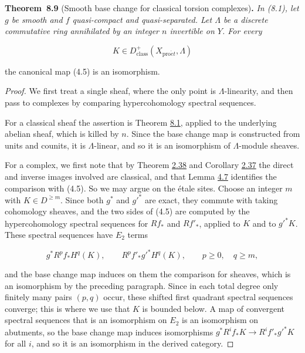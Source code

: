 \documentclass[11pt]{article}
\newenvironment{bpstatement}[2]{\par\addvspace{0.6\baselineskip}\noindent\textbf{#1}#2\textbf{.}\enspace\ignorespaces}
  {\par\addvspace{0.4\baselineskip}}
\newenvironment{bpstatementit}[2]{\begin{bpstatement}{#1}{#2}\itshape\ignorespaces}{\end{bpstatement}}
\begin{document}
\label{bp674}%
\begin{bpstatementit}{Theorem~8.9}{ (Smooth base change for classical torsion complexes)}
In (8.1), let \(g\) be smooth and \(f\) quasi-compact and quasi-separated. Let \(\Lambda\) be a discrete commutative ring annihilated by an integer \(n\) invertible on \(Y\). For every

\[
K\in D^+_{\mathrm{class}}(X_{\mathrm{pro}\acute{e}t},\Lambda)
\]

the canonical map (4.5) is an isomorphism.
\end{bpstatementit}

\begin{proof}[{Proof}]\label{bp675}%
We first treat a single sheaf, where the only point is \(\Lambda\)-linearity, and then pass to complexes by comparing hypercohomology spectral sequences.

For a classical sheaf the assertion is Theorem \hyperref[bp643]{8.1}, applied to the underlying abelian sheaf, which is killed by \(n\). Since the base change map is constructed from units and counits, it is \(\Lambda\)-linear, and so it is an isomorphism of \(\Lambda\)-module sheaves.

For a complex, we first note that by Theorem \hyperref[bp113]{2.38} and Corollary \hyperref[bp109]{2.37} the direct and inverse images involved are classical, and that Lemma \hyperref[bp304]{4.7} identifies the comparison with (4.5). So we may argue on the étale sites. Choose an integer \(m\) with \(K\in D^{\geq m}\). Since both \(g^*\) and \(g'^*\) are exact, they commute with taking cohomology sheaves, and the two sides of (4.5) are computed by the hypercohomology spectral sequences for \(Rf_*\) and \(Rf'_*\), applied to \(K\) and to \(g'^*K\). These spectral sequences have \(E_2\) terms

\[
g^*R^pf_*H^q(K),\qquad R^pf'_*g'^*H^q(K),
\qquad p\geq0,\quad q\geq m,
\]

and the base change map induces on them the comparison for sheaves, which is an isomorphism by the preceding paragraph. Since in each total degree only finitely many pairs \((p,q)\) occur, these shifted first quadrant spectral sequences converge; this is where we use that \(K\) is bounded below. A map of convergent spectral sequences that is an isomorphism on \(E_2\) is an isomorphism on abutments, so the base change map induces isomorphisms \(g^*R^if_*K\to R^if'_*g'^*K\) for all \(i\), and so it is an isomorphism in the derived category.
\end{proof}
\end{document}
